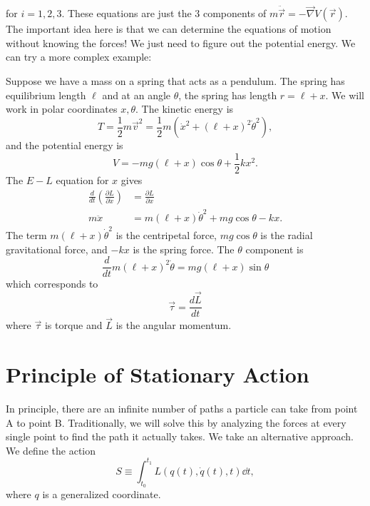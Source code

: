 \documentclass{article}
\numberwithin{equation}{section}
\begin{document}
for $i=1,2,3$. These equations are just the $3$ components of $m\ddot{\vec{r}} = - \vec{\nabla} V(\vec{r})$. The important idea here is that we can determine the equations of motion without knowing the forces! We just need to figure out the potential energy. We can try a more complex example:
\begin{example}
    Suppose we have a mass on a spring that acts as a pendulum. The spring has equilibrium length $\ell$ and at an angle $\theta$, the spring has length $r=\ell + x$. We will work in polar coordinates $x,\theta.$ The kinetic energy is
    \begin{equation}
        T = \frac{1}{2}m\vec{v}^2 = \frac{1}{2}m\left(\dot{x}^2 + (\ell+x)^2\dot{\theta}^2\right),
    \end{equation}
    and the potential energy is
    \begin{equation}
        V = -mg(\ell+x)\cos\theta + \frac{1}{2}kx^2.
    \end{equation}
    The $E-L$ equation for $x$ gives
    \begin{align}
        \frac{d}{dt}\left(\frac{\partial L}{\partial \dot{x}}\right) &= \frac{\partial L}{\partial x} \\
        m\ddot{x} &= m(\ell + x)\dot{\theta}^2 + mg\cos\theta - kx.
    \end{align}
    The term $m(\ell + x)\dot{\theta}^2$ is the centripetal force, $mg\cos\theta$ is the radial gravitational force, and $-kx$ is the spring force. The $\theta$ component is 
    \begin{equation}
        \frac{d}{dt}m(\ell + x)^2\dot{\theta} = mg(\ell + x)\sin\theta
    \end{equation}
    which corresponds to 
    \begin{equation}
        \vec{\tau} = \frac{d\vec{L}}{dt}
    \end{equation}
    where $\vec{\tau}$ is torque and $\vec{L}$ is the angular momentum.
\end{example}
\section{Principle of Stationary Action}
In principle, there are an infinite number of paths a particle can take from point A to point B. Traditionally, we will solve this by analyzing the forces at every single point to find the path it actually takes. We take an alternative approach. We define the action 
\begin{equation}
    S \equiv \int_{t_0}^{t_1} L(q(t),\dot{q}(t),t) \dd{t},
\end{equation}
where $q$ is a generalized coordinate.
\end{document}
